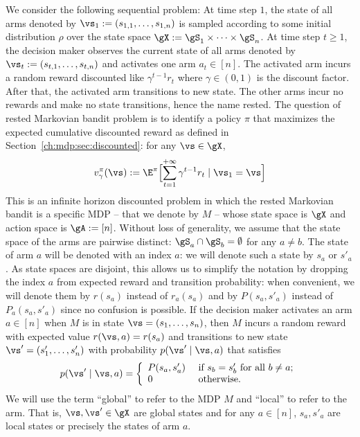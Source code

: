 We consider the following sequential problem: At time step $1$, the state of all arms denoted by $\vs_1:=(s_{1,1},\dots,s_{1,n})$ is sampled according to some initial distribution $\rho$ over the state space $\gX:=\gS_1\times\dots\times\gS_n$.
At time step $t\ge1$, the decision maker observes the current state of all arms denoted by $\vs_t:=(s_{t,1},\dots,s_{t,n})$ and activates one arm $a_t\in[n]$.
The activated arm incurs a random reward discounted like $\gamma^{t-1}r_t$ where $\gamma\in(0,1)$ is the discount factor.
After that, the activated arm transitions to new state. %
The other arms incur no rewards and make no state transitions, hence the name rested.
The question of rested Markovian bandit problem is to identify a policy $\pi$ that maximizes the expected cumulative discounted reward as defined in Section~\ref{ch:mdp:sec:discounted}: for any $\vs\in\gX$,
\begin{equation}
    \label{ch:mb:value}
    v_\gamma^\pi(\vs):=\E^\pi\Bigl[\sum_{t=1}^{+\infty} \gamma^{t-1}r_t \mid \vs_1=\vs\Bigr]
\end{equation}
This is an infinite horizon discounted problem in which the rested Markovian bandit is a specific MDP -- that we denote by $M$ -- whose state space is $\gX$ and action space is $\gA:=[n]$.
Without loss of generality, we assume that the state space of the arms are pairwise distinct: $\gS_a\cap\gS_b=\emptyset$ for any $a\neq b$.
The state of arm $a$ will be denoted with an index $a$: we will denote such a state by $s_a$ or $s'_a$.
As state spaces are disjoint, this allows us to simplify the notation by dropping the index $a$ from expected reward and transition probability: when convenient, we will denote them by $r(s_a)$ instead of $r_a(s_a)$ and by $P(s_a,s'_a)$ instead of $P_a(s_a,s'_a)$ since no confusion is possible.
If the decision maker activates an arm $a\in[n]$ when $M$ is in state $\vs=(s_1,\dots,s_n)$, then $M$ incurs a random reward with expected value $r(\vs,a)=r(s_a)$ and transitions to new state $\vs'=(s'_1,\dots,s'_n)$ with probability $p(\vs'\mid \vs, a)$ that satisfies
\begin{equation}
    \label{ch:mb:P_defn}
    p(\vs'\mid \vs, a)
    = 
    \left\{
        \begin{array}{ll}
            P(s_a,s'_a) & \text{ if $s_b=s'_b$ for all $b\ne a$;}\\
            0 &\text{ otherwise}.
        \end{array}
    \right.
\end{equation}
We will use the term ``global'' to refer to the MDP $M$ and ``local'' to refer to the arm.
That is, $\vs, \vs'\in\gX$ are global states and for any $a\in[n]$, $s_a,s'_a$ are local states or precisely the states of arm $a$.

